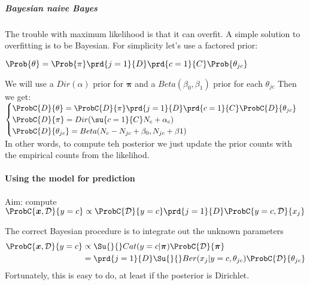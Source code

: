 \subparagraph{Bayesian naive Bayes}
The trouble with maximum likelihood is that it can overfit. 
A simple solution to overfitting is to be Bayesian.
For simplicity let's use a factored prior:
\begin{center}
    $\Prob{\theta} = \Prob{\pi}\prd{j=1}{D}\prd{c=1}{C}\Prob{\theta_{jc}}$
\end{center}
We will use a $Dir(\alpha)$ prior for $\bm{\pi}$ and a $Beta(\beta_{0}, \beta_{1})$ prior
for each $\theta_{jc}$
Then we get:
$\begin{cases}
    \ProbC{D}{\theta} = \ProbC{D}{\pi}\prd{j=1}{D}\prd{c=1}{C}\ProbC{D}{\theta_{jc}}\\
    \ProbC{D}{\pi} = Dir(\su{c=1}{C}N_{c}+\alpha_{c}) \\
    \ProbC{D}{\theta_{jc}} = Beta(N_{c}-N_{jc} + \beta_{0}, N_{jc} + \beta{1})
\end{cases}$ \\
In other words, to compute teh posterior we just update the prior counts with the 
empirical counts from the likelihod.

\paragraph{Using the model for prediction}
Aim: compute 
$\ProbC{\bm{x}, \mathcal{D}}{y=c} \propto \ProbC{\mathcal{D}}{y=c}\prd{j=1}{D}
\ProbC{y=c, \mathcal{D}}{x_{j}}$

The correct Bayesian procedure is to integrate out the unknown parameters 
\begin{align*}
\ProbC{\bm{x}, \mathcal{D}}{y=c}
&\propto \Su{}{}Cat(y=c|\bm{\pi})\ProbC{\mathcal{D}}{\bm{\pi}}\\
&= \prd{j=1}{D}\Su{}{}Ber(x_{j}|y=c, \theta_{jc})\ProbC{\mathcal{D}}{\theta_{jc}}
\end{align*}
Fortunately, this is easy to do, at least if the posterior is Dirichlet.

